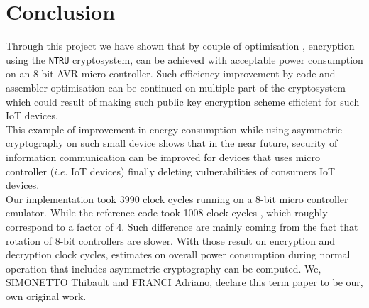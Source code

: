 \section{Conclusion}
\label{sec:conclusion}
Through this project we have shown that by couple of optimisation , encryption using the \texttt{NTRU} cryptosystem, can be achieved with acceptable power consumption on an 8-bit AVR micro controller. Such efficiency improvement by code and assembler optimisation can be continued on multiple part of the cryptosystem which could result of making such public key encryption scheme  efficient for such IoT devices.\\
This example of improvement in energy consumption while using asymmetric cryptography on such small device shows that in the near future, security of information communication can be improved for devices that uses micro controller ($i.e.$ IoT devices) finally deleting vulnerabilities of consumers IoT devices.\\ 
	Our implementation took 3990 clock cycles running on a 8-bit micro controller emulator. While the reference code \cite{dai_optimizing_2018} took 1008 clock cycles , which roughly correspond to a factor of 4. Such difference are mainly coming from the fact that rotation of 8-bit controllers are slower. With those result on encryption and decryption clock cycles, estimates on overall power consumption during normal operation that includes asymmetric cryptography can be computed.
	\newline
	\newline
	\newline
	\newline
	\newline
	\newline
	\newline
	\newline
	We, SIMONETTO Thibault and FRANCI Adriano, declare this term paper to be
our, own original work.
	
